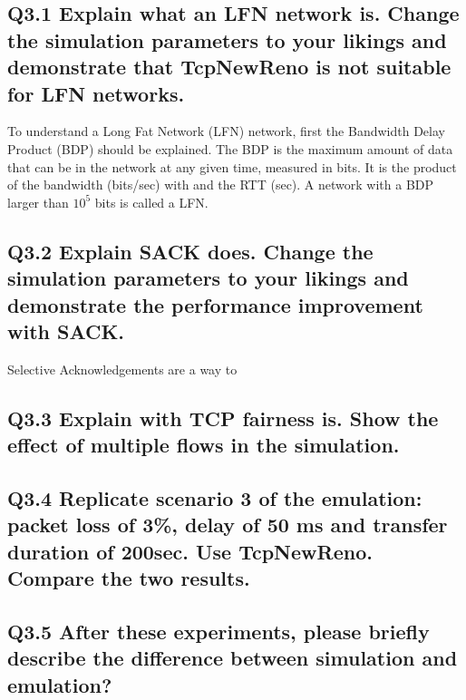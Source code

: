 \documentclass{article}
\begin{document}
\subsection{Q3.1 Explain what an LFN network is. Change the simulation
parameters to your likings and demonstrate that TcpNewReno is not
suitable for LFN networks.}

To understand a Long Fat Network (LFN) network, first the Bandwidth Delay Product (BDP) should be explained. The BDP is the maximum amount of data that can be in the network at any given time, measured in bits. It is the product of the bandwidth (bits/sec) with and the RTT (sec). 
A network with a BDP larger than $10^5$ bits is called a LFN.



\subsection{Q3.2 Explain SACK does. Change the simulation parameters to
your likings and demonstrate the performance improvement with SACK.}

Selective Acknowledgements are a way to 

\subsection{Q3.3 Explain with TCP fairness is. Show the effect of
multiple flows in the simulation.}

\subsection{Q3.4 Replicate scenario 3 of the emulation: packet loss of
3\%, delay of 50 ms and transfer duration of 200sec. Use TcpNewReno.
Compare the two results.}

\subsection{Q3.5 After these experiments, please briefly describe the
difference between simulation and emulation?}

\newpage
\printbibliography
\end{document}
